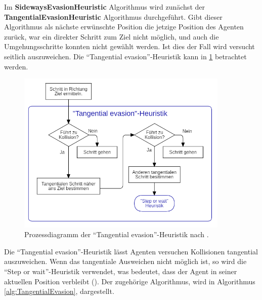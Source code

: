 Im \textbf{SidewaysEvasionHeuristic} Algorithmus wird zunächst der \textbf{TangentialEvasionHeuristic} Algorithmus durchgeführt. Gibt dieser Algorithmus als nächste erwünschte Position die jetzige Position des Agenten zurück, war ein direkter Schritt zum Ziel nicht möglich, und auch die Umgehungsschritte konnten nicht gewählt werden. Ist dies der Fall wird versucht seitlich auszuweichen.
Die "`Tangential evasion"'-Heuristik kann in \ref{fig:tangentialHeuristik} betrachtet werden.
\begin{figure}[H]
	\centering
		\includegraphics[width=0.9\textwidth]{pictures/model/algorithm/heuristics/tangential_evasion_heuristic.png}
	\caption{Prozessdiagramm der "`Tangential evasion"'-Heuristik nach \cite{Seitz.2016}.}
	\label{fig:tangentialHeuristik}
\end{figure} 
Die "`Tangential evasion"'-Heuristik lässt Agenten versuchen Kollisionen tangential auszuweichen. Wenn das tangentiale Ausweichen nicht möglich ist, so wird die "`Step or wait"'-Heuristik verwendet, was bedeutet, dass der Agent in seiner aktuellen Position verbleibt (\cite{Seitz.2016}). Der zugehörige Algorithmus, wird in Algorithmus \ref{alg:TangentialEvasion}, dargestellt.
\clearpage
